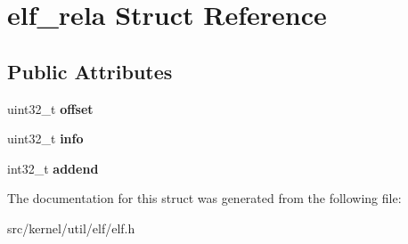 \hypertarget{structelf__rela}{}\section{elf\+\_\+rela Struct Reference}
\label{structelf__rela}
\subsection*{Public Attributes}
\begin{DoxyCompactItemize}
\item 
\mbox{\label{structelf__rela_a0972c06f1c2da8fc4a38208b071ccecf}} 
uint32\+\_\+t {\bfseries offset}
\item 
\mbox{\label{structelf__rela_a0aed6a2b2326c39ffced5e8140d4db28}} 
uint32\+\_\+t {\bfseries info}
\item 
\mbox{\label{structelf__rela_aa2d9d8f4613db583003316d6c47ba856}} 
int32\+\_\+t {\bfseries addend}
\end{DoxyCompactItemize}


The documentation for this struct was generated from the following file\+:\begin{DoxyCompactItemize}
\item 
src/kernel/util/elf/elf.\+h\end{DoxyCompactItemize}
